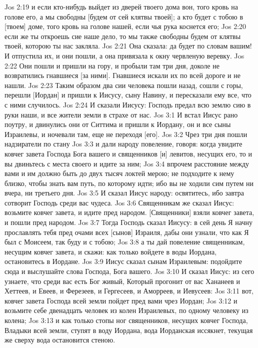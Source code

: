 Jos 2:19  и если кто-нибудь выйдет из дверей твоего дома вон, того кровь на голове его, а мы свободны [будем от сей клятвы твоей]; а кто будет с тобою в [твоем] доме, того кровь на голове нашей, если чья рука коснется его;
Jos 2:20  если же ты откроешь сие наше дело, то мы также свободны будем от клятвы твоей, которою ты нас закляла.
Jos 2:21  Она сказала: да будет по словам вашим! И отпустила их, и они пошли, а она привязала к окну червленую веревку.
Jos 2:22  Они пошли и пришли на гору, и пробыли там три дня, доколе не возвратились гнавшиеся [за ними]. Гнавшиеся искали их по всей дороге и не нашли.
Jos 2:23  Таким образом два сии человека пошли назад, сошли с горы, перешли [Иордан] и пришли к Иисусу, сыну Навину, и пересказали ему все, что с ними случилось.
Jos 2:24  И сказали Иисусу: Господь предал всю землю сию в руки наши, и все жители земли в страхе от нас.
Jos 3:1  И встал Иисус рано поутру, и двинулись они от Ситтима и пришли к Иордану, он и все сыны Израилевы, и ночевали там, еще не переходя [его].
Jos 3:2  Чрез три дня пошли надзиратели по стану
Jos 3:3  и дали народу повеление, говоря: когда увидите ковчег завета Господа Бога вашего и священников [и] левитов, несущих его, то и вы двиньтесь с места своего и идите за ним;
Jos 3:4  впрочем расстояние между вами и им должно быть до двух тысяч локтей мерою; не подходите к нему близко, чтобы знать вам путь, по которому идти; ибо вы не ходили сим путем ни вчера, ни третьего дня.
Jos 3:5  И сказал Иисус народу: освятитесь, ибо завтра сотворит Господь среди вас чудеса.
Jos 3:6  Священникам же сказал Иисус: возьмите ковчег завета, и идите пред народом. [Священники] взяли ковчег завета, и пошли пред народом.
Jos 3:7  Тогда Господь сказал Иисусу: в сей день Я начну прославлять тебя пред очами всех [сынов] Израиля, дабы они узнали, что как Я был с Моисеем, так буду и с тобою;
Jos 3:8  а ты дай повеление священникам, несущим ковчег завета, и скажи: как только войдете в воды Иордана, остановитесь в Иордане.
Jos 3:9  Иисус сказал сынам Израилевым: подойдите сюда и выслушайте слова Господа, Бога вашего.
Jos 3:10  И сказал Иисус: из сего узнаете, что среди вас есть Бог живый, Который прогонит от вас Хананеев и Хеттеев, и Евеев, и Ферезеев, и Гергесеев, и Аморреев, и Иевусеев:
Jos 3:11  вот, ковчег завета Господа всей земли пойдет пред вами чрез Иордан;
Jos 3:12  и возьмите себе двенадцать человек из колен Израилевых, по одному человеку из колена;
Jos 3:13  и как только стопы ног священников, несущих ковчег Господа, Владыки всей земли, ступят в воду Иордана, вода Иорданская иссякнет, текущая же сверху вода остановится стеною.
